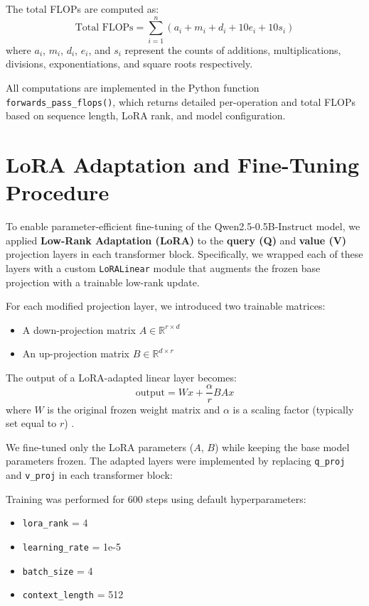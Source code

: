 \documentclass[a4paper,12pt]{article}
\begin{document}
The total FLOPs are computed as:
\[
\text{Total FLOPs} = \sum_{i=1}^{n} \left( a_i + m_i + d_i + 10e_i + 10s_i \right)
\]
where $a_i$, $m_i$, $d_i$, $e_i$, and $s_i$ represent the counts of additions, multiplications, divisions, exponentiations, and square roots respectively.

All computations are implemented in the Python function \texttt{forwards\_pass\_flops()}, which returns detailed per-operation and total FLOPs based on sequence length, LoRA rank, and model configuration.


\section{LoRA Adaptation and Fine-Tuning Procedure}

To enable parameter-efficient fine-tuning of the Qwen2.5-0.5B-Instruct model, we applied \textbf{Low-Rank Adaptation (LoRA)} to the \textbf{query (Q)} and \textbf{value (V)} projection layers in each transformer block. Specifically, we wrapped each of these layers with a custom \texttt{LoRALinear} module that augments the frozen base projection with a trainable low-rank update.

For each modified projection layer, we introduced two trainable matrices:
\begin{itemize}
    \item A down-projection matrix $A \in \mathbb{R}^{r \times d}$
    \item An up-projection matrix $B \in \mathbb{R}^{d \times r}$
\end{itemize}

The output of a LoRA-adapted linear layer becomes:
\[
\text{output} = W x + \frac{\alpha}{r} B A x
\]
where $W$ is the original frozen weight matrix and $\alpha$ is a scaling factor (typically set equal to $r$) \citep{hu2021lora}.

We fine-tuned only the LoRA parameters ($A$, $B$) while keeping the base model parameters frozen. The adapted layers were implemented by replacing \texttt{q\_proj} and \texttt{v\_proj} in each transformer block:

Training was performed for 600 steps using default hyperparameters:
\begin{itemize}
    \item \texttt{lora\_rank} = 4
    \item \texttt{learning\_rate} = 1e-5
    \item \texttt{batch\_size} = 4
    \item \texttt{context\_length} = 512
\end{itemize}
\end{document}
